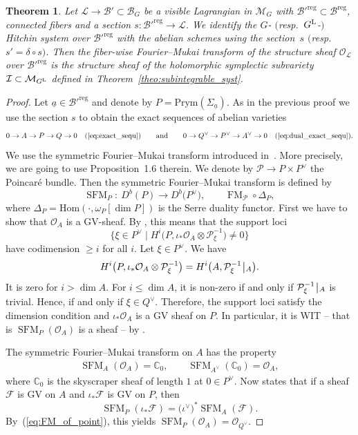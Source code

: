 \documentclass[10pt,a4paper]{amsart}
\numberwithin{equation}{section}
\newtheorem{theo}{Theorem}[section]
\theoremstyle{definition}
\newcommand{\Hom}{\mathrm{Hom}}
\newcommand{\reg}{\mathrm{reg}}
\renewcommand{\and}{\mathrm{and}}
\newcommand{\rest}{\: \rule[-3.5pt]{0.5pt}{11.5pt}\,{}}
\renewcommand{\to}{\rightarrow}
\newcommand{\calB}{\mathcal{B}}
\newcommand{\calF}{\mathcal{F}}
\newcommand{\calI}{\mathcal{I}}
\newcommand{\calL}{\mathcal{L}}
\newcommand{\calM}{\mathcal{M}}
\newcommand{\calO}{\mathcal{O}}
\newcommand{\calP}{\mathcal{P}}
\newcommand{\CC}{\mathbb{C}}
\DeclareMathOperator{\SFM}{SFM}
\DeclareMathOperator{\FM}{FM}
\newcommand{\Prym}{\mathrm{Prym}}
\begin{document}
\begin{theo}\label{theo:FM} Let $\calL \to \calB'\subset \calB_{G}$ be a visible Lagrangian in $\calM_G$ with $\calB'^\reg \subset \calB^\reg$, connected fibers and a section $s\colon \calB'^\reg \to \calL$. We identify the $G$- $($resp.\ $G^{\rm L}$-$)$ Hitchin system over $\calB'^\reg$ with the abelian schemes using the section~$s$ $($resp.\ $s'=\delta \circ s)$. Then the fiber-wise Fourier--Mukai transform of the structure sheaf $\calO_{\calL}$ over $\calB'^\reg$ is the structure sheaf of the holomorphic symplectic subvariety $\calI \subset \calM_{G^{\rm L}}$ defined in Theorem~{\rm \ref{theo:subintegrable_syst}}.
\end{theo}
\begin{proof}
 Let $\underline{a} \in \calB'^\reg$ and denote by $P=\Prym(\Sigma_{\underline{a}})$. As in the previous proof we use the section $s$ to obtain the exact sequences of abelian varieties
 \[ 0 \to A \to P \to Q \to 0 \quad (\ref{eq:exact_sequ}) \qquad \and \qquad 0 \to Q^\vee \to P^\vee \to A^\vee \to 0 \quad (\ref{eq:dual_exact_sequ}).
 \]
 We use the symmetric Fourier--Mukai transform introduced in~\cite{Schnell}. More precisely, we are going to use Proposition~1.6 therein. We denote by $\calP \to P \times P^\vee$ the Poincar\'e bundle. Then the symmetric Fourier--Mukai transform is defined by
 \[ \SFM_P\colon \ D^b(P) \to D^b\bigl(P^\vee\bigr), \qquad \FM_{\calP} \circ \Delta_P,
 \]
 where $\Delta_P=\Hom(\cdot,\omega_P[\dim P])$ is the Serre duality functor. First we have to show that $\calO_A$ is a GV-sheaf. By \cite[Definition~3.1]{PareschiPopa}, this means that the support loci
 \[ \bigl\{ \xi \in P^\vee \mid H^i\bigl(P,\iota_*\calO_A \otimes \calP_\xi^{-1}\bigr)\neq 0 \bigr\}
 \]
 have codimension $\geq i$ for all $i$. Let $\xi \in P^\vee$. We have
 \[ H^i\bigl(P,\iota_*\calO_A \otimes \calP_\xi^{-1}\bigr)=H^i\bigl(A,\calP_\xi^{-1}\rest_{A}\bigr).
 \]
 It is zero for $i > \dim A$. For $i \leq \dim A$, it is non-zero if and only if $\calP_\xi^{-1} \rest_A$ is trivial. Hence, if and only if $\xi \in Q^\vee$. Therefore, the support loci satisfy the dimension condition and $\iota_*\calO_A$ is a GV sheaf on $P$. In particular, it is WIT -- that is $\SFM_P(\calO_A)$ is a sheaf -- by \cite[Proposition~3.2]{PareschiPopa}.

 The symmetric Fourier--Mukai transform on $A$ has the property
 \begin{align} \label{eq:FM_of_point} \SFM_A(\calO_A)=\CC_0, \qquad \SFM_{A^\vee}(\CC_0) = \calO_{A},
 \end{align}
 where $\CC_0$ is the skyscraper sheaf of length $1$ at $0 \in P^\vee$. Now \cite[Proposition~1.6]{Schnell} states that if a sheaf $\calF$ is GV on $A$ and $\iota_*\calF$ is GV on $P$, then
 \[ \SFM_P(\iota_*\calF)=\bigl(\iota^\vee\bigr)^*\SFM_A(\calF).
 \]
 By~(\ref{eq:FM_of_point}), this yields $\SFM_P(\calO_A)=\calO_{Q^\vee}$.
\end{proof}
\end{document}
